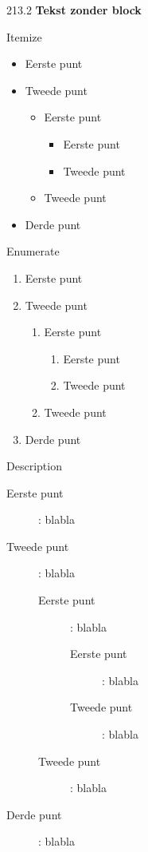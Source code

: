 \documentclass[final]{beamer}
\begin{document}
\begin{frame}{}
\begin{textblock}{213.2}
\textbf{Tekst zonder block}

\lipsum[5]

\begin{block}{Itemize}
\begin{itemize}
  \item Eerste punt
  \item Tweede punt
    \begin{itemize}
      \item Eerste punt
        \begin{itemize}
          \item Eerste punt
          \item Tweede punt
        \end{itemize}
      \item Tweede punt
    \end{itemize}
  \item Derde punt
\end{itemize}
\end{block}

\begin{block}{Enumerate}
\begin{enumerate}
  \item Eerste punt
  \item Tweede punt
    \begin{enumerate}
      \item Eerste punt
        \begin{enumerate}
          \item Eerste punt
          \item Tweede punt
        \end{enumerate}
      \item Tweede punt
    \end{enumerate}
  \item Derde punt
\end{enumerate}
\end{block}



\begin{block}{Description}
\begin{description}
  \item [Eerste punt]: blabla
  \item [Tweede punt]: blabla
    \begin{description}
      \item [Eerste punt]: blabla
        \begin{description}
          \item [Eerste punt]: blabla
          \item [Tweede punt]: blabla
        \end{description}
      \item [Tweede punt]: blabla
    \end{description}
  \item [Derde punt]: blabla
\end{description}
\end{block}


\end{textblock}
\end{frame}
\end{document}
